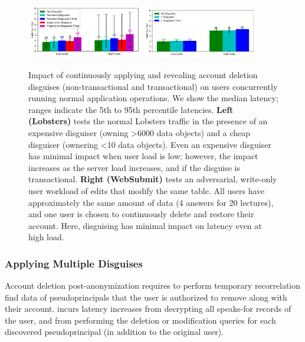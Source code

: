 \begin{figure}[t]
    \centering
        \includegraphics[width=0.45\textwidth]{figs/lobsters_concurrent_results}
        \includegraphics[width=0.45\textwidth]{figs/websubmit_concurrent_results}
    \caption{Impact of continuously applying and revealing account deletion disguises (non-transactional and transactional) on users concurrently running
    normal application operations. We show the median latency; ranges indicate the 5th to 95th
    percentile latencies.
    \textbf{Left (Lobsters)} tests the normal Lobsters traffic in the presence of an expensive
    disguiser (owning >6000 data objects) and a cheap disguiser (ownering <10 data objects). Even an expensive disguiser has minimal impact when user load is low; however, the impact increases as the server load increases, and if the
    disguise is transactional.
    \textbf{Right (WebSubmit)} tests an adversarial, write-only user workload of edits that
    modify the same table. All users have approximately the same amount of data (4 answers for 20
    lectures), and one user is chosen to continuously delete and restore their account. Here,
    disguising has minimal impact on latency even at high load.
    }
    \label{fig:concurrent}
\end{figure}

\subsubsection{Applying Multiple Disguises}


Account deletion post-anonymization requires \sys to perform temporary recorrelation find data of
pseudoprincipals that the user is authorized to remove along with their account. \sys incurs latency
increases from decrypting all speaks-for records of the user, and from performing the deletion or
modification queries for each discovered pseudoprincipal (in addition to the original user).

